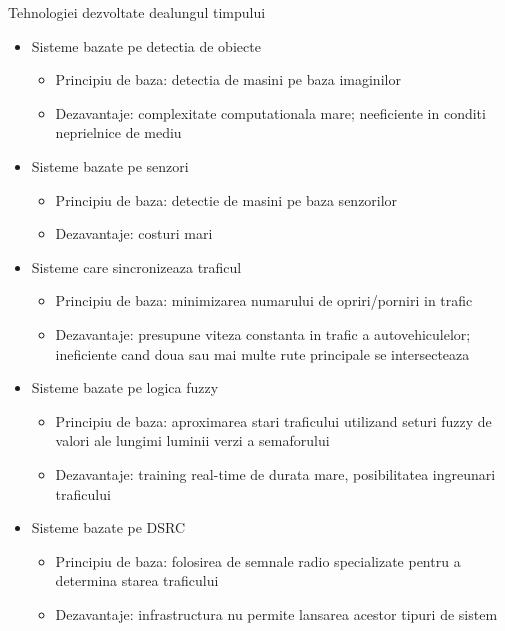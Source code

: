 \documentclass{beamer}
\begin{document}
    \begin{frame}{Tehnologiei dezvoltate dealungul timpului}
        \begin{itemize}[<+-| alert@+>]
            \item Sisteme bazate pe detectia de obiecte 
            \begin{itemize}
                \item Principiu de baza: detectia de masini pe baza imaginilor
                \item Dezavantaje: complexitate computationala mare; neeficiente in conditi neprielnice de mediu
            \end{itemize}
            \item Sisteme bazate pe senzori
            \begin{itemize}
                \item Principiu de baza: detectie de masini pe baza senzorilor
                \item Dezavantaje: costuri mari
            \end{itemize}
            \item Sisteme care sincronizeaza traficul
            \begin{itemize}
                \item Principiu de baza: minimizarea numarului de opriri/porniri in trafic
                \item Dezavantaje: presupune viteza constanta in trafic a autovehiculelor; ineficiente cand doua sau mai multe
                rute principale se intersecteaza
            \end{itemize}
            \item Sisteme bazate pe logica fuzzy
            \begin{itemize}
                \item Principiu de baza: aproximarea stari traficului utilizand seturi fuzzy de valori ale lungimi luminii verzi a semaforului
                \item Dezavantaje: training real-time de durata mare, posibilitatea ingreunari traficului
            \end{itemize}
            \item Sisteme bazate pe DSRC
            \begin{itemize}
                \item Principiu de baza: folosirea de semnale radio specializate pentru a determina starea traficului
                \item Dezavantaje: infrastructura nu permite lansarea acestor tipuri de sistem
            \end{itemize}
        \end{itemize}
    \end{frame}
\end{document}
